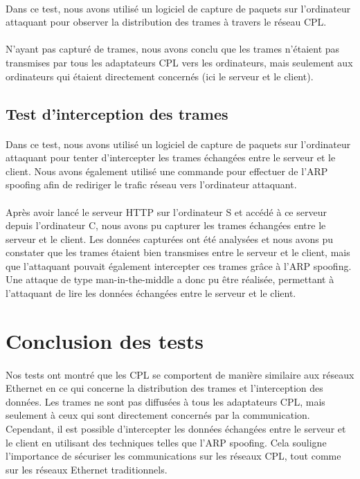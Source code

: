 \documentclass[a4paper,twocolumn]{report}
\begin{document}
\paragraph{}Dans ce test, nous avons utilisé un logiciel de capture de paquets sur 
l'ordinateur attaquant pour observer la distribution des trames à travers le réseau CPL. 
\paragraph{}N'ayant pas capturé de trames, nous avons conclu que les trames n'étaient
pas transmises par tous les adaptateurs CPL vers les ordinateurs,
mais seulement aux ordinateurs qui étaient directement concernés (ici le serveur et le client).

\subsection{Test d'interception des trames}
\paragraph{}Dans ce test, nous avons utilisé un logiciel de capture de paquets sur 
l'ordinateur attaquant pour tenter d'intercepter les trames échangées entre le serveur et le client.
Nous avons également utilisé une commande pour effectuer de l'ARP spoofing afin 
de rediriger le trafic réseau vers l'ordinateur attaquant.
\paragraph{}Après avoir lancé le serveur HTTP sur l'ordinateur S et accédé à ce serveur
depuis l'ordinateur C, nous avons pu capturer les trames échangées entre le serveur et le client.
Les données capturées ont été analysées et nous avons pu constater que les trames étaient bien transmises
entre le serveur et le client, mais que l'attaquant pouvait également intercepter
ces trames grâce à l'ARP spoofing. Une attaque de type man-in-the-middle a donc pu être réalisée,
permettant à l'attaquant de lire les données échangées entre le serveur et le client.

\section{Conclusion des tests}
\paragraph{}Nos tests ont montré que les CPL se comportent de manière similaire
aux réseaux Ethernet en ce qui concerne la distribution des trames et l'interception des données.
Les trames ne sont pas diffusées à tous les adaptateurs CPL, mais seulement 
à ceux qui sont directement concernés par la communication. Cependant,
il est possible d'intercepter les données échangées entre le serveur et le client
en utilisant des techniques telles que l'ARP spoofing. Cela souligne l'importance de
sécuriser les communications sur les réseaux CPL, tout comme sur les réseaux Ethernet traditionnels.
\end{document}
